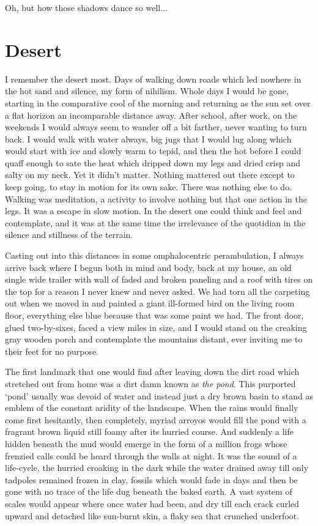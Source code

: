 \documentclass[ebook, 10pt, openright, onecolumn]{memoir}
\begin{document}
Oh, but how those shadows dance so well...

\chapter{Desert}
\label{cha:desert}


I remember the desert most.  Days of walking down roads which led nowhere in the
hot sand and silence, my form of nihilism.  Whole days I would be gone, starting
in the comparative cool of the morning and returning as the sun set over a flat
horizon an incomparable distance away.  After school, after work, on the
weekends I would always seem to wander off a bit farther, never wanting to turn
back.  I would walk with water always, big jugs that I would lug along which
would start with ice and slowly warm to tepid, and then the hot before I could
quaff enough to sate the heat which dripped down my legs and dried crisp and
salty on my neck.  Yet it didn't matter.  Nothing mattered out there except to
keep going, to stay in motion for its own sake.  There was nothing else to do.
Walking was meditation, a activity to involve nothing but that one action in the
legs.  It was a escape in slow motion.  In the desert one could think and feel
and contemplate, and it was at the same time the irrelevance of the quotidian in
the silence and stillness of the terrain.  

Casting out into this distances in some omphalocentric perambulation, I always
arrive back where I begun both in mind and body, back at my house, an old single
wide trailer with wall of faded and broken paneling and a roof with tires on the
top for a reason I never knew and never asked.  We had torn all the carpeting
out when we moved in and painted a giant ill-formed bird on the living room
floor, everything else blue because that was some paint we had. The front door,
glued two-by-sixes, faced a view miles in size, and I would stand on the
creaking gray wooden porch and contemplate the mountains distant, ever inviting
me to their feet for no purpose.

The first landmark that one would find after leaving down the dirt road which
stretched out from home was a dirt damn known as \textit{the pond}.  This
purported `pond' usually was devoid of water and instead just a dry brown basin
to stand as emblem of the constant aridity of the landscape.  When the rains
would finally come first hesitantly, then completely, myriad arroyos would fill
the pond with a fragrant brown liquid still foamy after its hurried course.  And
suddenly a life hidden beneath the mud would emerge in the form of a million
frogs whose frenzied calls could be heard through the walls at night.  It was
the sound of a life-cycle, the hurried croaking in the dark while the water
drained away till only tadpoles remained frozen in clay, fossils which would
fade in days and then be gone with no trace of the life dug beneath the baked
earth.  A vast system of scales would appear where once water had been, and dry
till each crack curled upward and detached like sun-burnt skin, a flaky sea
that crunched underfoot.
\end{document}
